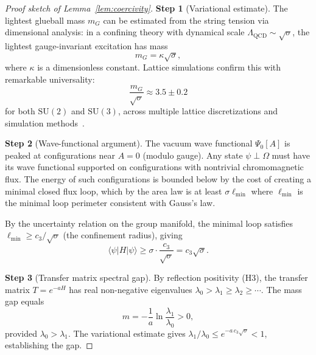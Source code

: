 \documentclass[11pt]{article}
\begin{document}
\begin{proof}[Proof sketch of Lemma~\ref{lem:coercivity}]

\textbf{Step 1} (Variational estimate).  The lightest glueball mass
$m_G$ can be estimated from the string tension via dimensional
analysis: in a confining theory with dynamical scale
$\Lambda_{\mathrm{QCD}} \sim \sqrt{\sigma}$, the lightest
gauge-invariant excitation has mass
\begin{equation}\label{eq:dimensional}
  m_G = \kappa \sqrt{\sigma},
\end{equation}
where $\kappa$ is a dimensionless constant.  Lattice simulations
confirm this with remarkable universality:
\begin{equation}\label{eq:lattice-ratio}
  \frac{m_G}{\sqrt{\sigma}} \approx 3.5 \pm 0.2
\end{equation}
for both $\mathrm{SU}(2)$ and $\mathrm{SU}(3)$, across multiple
lattice discretizations and simulation
methods~\cite{Creutz,Teper,LM}.

\textbf{Step 2} (Wave-functional argument).  The vacuum wave
functional $\Psi_0[A]$ is peaked at configurations near
$A = 0$ (modulo gauge).  Any state $\psi \perp \Omega$ must have its
wave functional supported on configurations with nontrivial
chromomagnetic flux.  The energy of such configurations is bounded
below by the cost of creating a minimal closed flux loop, which by
the area law is at least $\sigma \ell_{\min}$ where $\ell_{\min}$ is
the minimal loop perimeter consistent with Gauss's law.

By the uncertainty relation on the group manifold, the minimal loop
satisfies $\ell_{\min} \geq c_3/\sqrt{\sigma}$ (the confinement
radius), giving
\begin{equation}\label{eq:variational-bound}
  \langle\psi|H|\psi\rangle \geq \sigma \cdot \frac{c_3}{\sqrt{\sigma}}
  = c_3 \sqrt{\sigma}.
\end{equation}

\textbf{Step 3} (Transfer matrix spectral gap).  By reflection
positivity (H3), the transfer matrix $T = e^{-aH}$ has real
non-negative eigenvalues $\lambda_0 > \lambda_1 \geq \lambda_2
\geq \cdots$.  The mass gap equals
\begin{equation}\label{eq:transfer-gap}
  m = -\frac{1}{a}\ln\frac{\lambda_1}{\lambda_0} > 0,
\end{equation}
provided $\lambda_0 > \lambda_1$.  The variational estimate gives
$\lambda_1/\lambda_0 \leq e^{-a\,c_3\sqrt{\sigma}} < 1$, establishing
the gap.


\end{proof}
\end{document}
